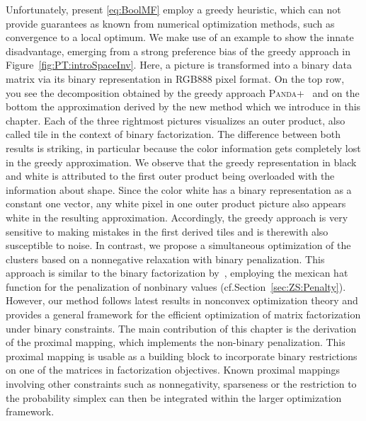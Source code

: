 Unfortunately, present \ref{eq:BoolMF} employ a greedy heuristic, which can not provide guarantees as known from numerical optimization methods, such as convergence to a local optimum. We make use of an example to show the innate disadvantage, emerging from a strong preference bias of the greedy approach in Figure~\ref{fig:PT:introSpaceInv}. Here, a picture is transformed into a binary data matrix via its binary representation in RGB888 pixel format. On the top row, you see the decomposition obtained by the greedy approach \textsc{Panda+}~\citep{lucchese2014unifying} and on the bottom the approximation derived by the new method which we introduce in this chapter. Each of the three rightmost pictures visualizes an outer product, also called tile in the context of binary factorization. The difference between both results is striking, in particular because the color information gets completely lost in the greedy approximation. We observe that the greedy representation in black and white is attributed to the first outer product being overloaded with the information about shape. Since the color white has a binary representation as a constant one vector, any white pixel in one outer product picture also appears white in the resulting approximation. Accordingly, the greedy approach is very sensitive to making mistakes in the first derived tiles and is therewith also susceptible to noise. In contrast, we propose a simultaneous optimization of the clusters based on a nonnegative relaxation with binary penalization. This approach is similar to the binary factorization by~\cite{zhang2007binary}, employing the mexican hat function for the penalization of nonbinary values (cf.\@ Section~\ref{sec:ZS:Penalty}). However, our method follows latest results in nonconvex optimization theory and provides a general framework for the efficient optimization of matrix factorization under binary constraints. The main contribution of this chapter is the derivation of the proximal mapping, which implements the non-binary penalization. This proximal mapping is usable as a building block to incorporate binary restrictions on one of the matrices in factorization objectives. Known proximal mappings involving other constraints such as nonnegativity, sparseness or the restriction to the probability simplex can then be integrated within the larger optimization framework.  


